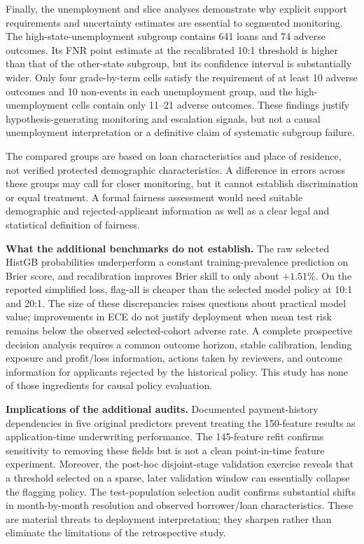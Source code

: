 \documentclass[10pt]{article}
\begin{document}
Finally, the unemployment and slice analyses demonstrate why explicit support requirements and uncertainty estimates are essential to segmented monitoring. The high-state-unemployment subgroup contains 641 loans and 74 adverse outcomes. Its FNR point estimate at the recalibrated 10:1 threshold is higher than that of the other-state subgroup, but its confidence interval is substantially wider. Only four grade-by-term cells satisfy the requirement of at least 10 adverse outcomes and 10 non-events in each unemployment group, and the high-unemployment cells contain only 11--21 adverse outcomes. These findings justify hypothesis-generating monitoring and escalation signals, but not a causal unemployment interpretation or a definitive claim of systematic subgroup failure.

The compared groups are based on loan characteristics and place of residence, not verified protected demographic characteristics. A difference in errors across these groups may call for closer monitoring, but it cannot establish discrimination or equal treatment. A formal fairness assessment would need suitable demographic and rejected-applicant information as well as a clear legal and statistical definition of fairness.

\noindent\textbf{What the additional benchmarks do not establish.} The raw selected HistGB probabilities underperform a constant training-prevalence prediction on Brier score, and recalibration improves Brier skill to only about $+1.51\%$. On the reported simplified loss, flag-all is cheaper than the selected model policy at 10:1 and 20:1. The size of these discrepancies raises questions about practical model value; improvements in ECE do not justify deployment when mean test risk remains below the observed selected-cohort adverse rate. A complete prospective decision analysis requires a common outcome horizon, stable calibration, lending exposure and profit/loss information, actions taken by reviewers, and outcome information for applicants rejected by the historical policy. This study has none of those ingredients for causal policy evaluation.

\noindent\textbf{Implications of the additional audits.} Documented payment-history dependencies in five original predictors prevent treating the 150-feature results as application-time underwriting performance. The 145-feature refit confirms sensitivity to removing these fields but is not a clean point-in-time feature experiment. Moreover, the post-hoc disjoint-stage validation exercise reveals that a threshold selected on a sparse, later validation window can essentially collapse the flagging policy. The test-population selection audit confirms substantial shifts in month-by-month resolution and observed borrower/loan characteristics. These are material threats to deployment interpretation; they sharpen rather than eliminate the limitations of the retrospective study.
\end{document}

